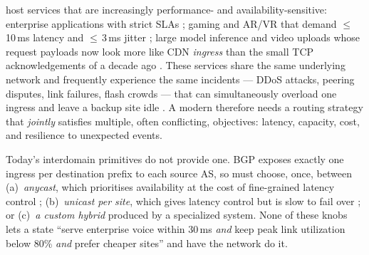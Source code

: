 \documentclass[acmsmall,anonymous,review,nonacm,10pt]{acmart}
\begin{document}
\servprods host services that are increasingly performance- and
availability-sensitive: enterprise applications with strict SLAs
\cite{painter,saving-private-wan}; gaming and AR/VR that demand
$\leq$\,10\,ms latency and $\leq$\,3\,ms jitter
\cite{latency-shears,vr-jitter-test}; large model inference and
video uploads whose request payloads now look more like CDN
\emph{ingress} than the small TCP acknowledgements of a decade ago
\cite{google-cloud-video-ai,microsoft-cloud-video-ai}.  These
services share the same underlying network and frequently experience
the same incidents --- DDoS attacks, peering disputes, link
failures, flash crowds --- that can simultaneously overload one
ingress and leave a backup site idle
\cite{moura2016anycast,ixp-scrubber,increasing-ddos-siliconangle,fastroute,tipsy,dhamdhere2018inferring}.
A modern \servprod therefore needs a routing strategy that
\emph{jointly} satisfies multiple, often conflicting, objectives:
latency, capacity, cost, and resilience to unexpected events.

Today's interdomain primitives do not provide one.  BGP exposes
exactly one ingress per destination prefix to each source AS, so
\servprods must choose, once, between (a)~\emph{anycast},
which prioritises availability at the cost of fine-grained
latency control \cite{tom-anycast,jiangchen-cdn-imc,regional-anycast};
(b)~\emph{unicast per site}, which gives latency control but is
slow to fail over \cite{cartographer,whyhigh,end-user-mapping,painter};
or (c)~\emph{a custom hybrid} produced by a specialized system.
None of these knobs lets a \servprod state ``serve enterprise
voice within 30\,ms \emph{and} keep peak link utilization below
80\% \emph{and} prefer cheaper sites'' and have the network do it.
\end{document}
